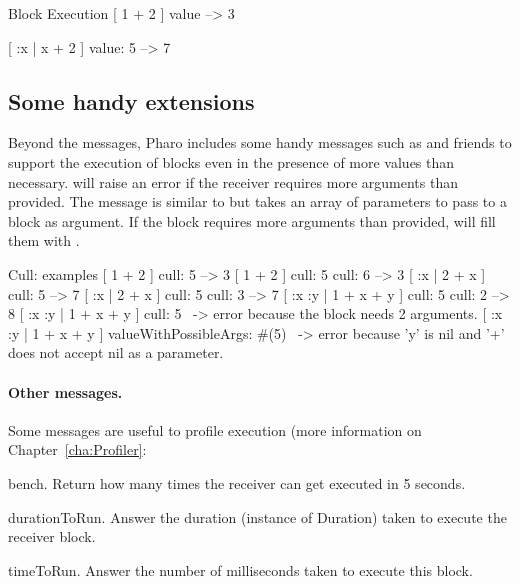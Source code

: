 \documentclass[a4paper,10pt,twoside]{book}
\begin{document}
\begin{code}{Block Execution}
[ 1 + 2 ] value --> 3

[ :x | x + 2 ] value: 5 --> 7
\end{code}

\subsection{Some handy extensions}

Beyond the  messages, Pharo includes some handy messages
such as  and friends to support the execution of blocks even
in the presence of more values than necessary.  will raise
an error if the receiver requires more arguments than provided. The
 message is similar to  but takes
an array of parameters to pass to a block as argument. If the block
requires more arguments than provided, 
will fill them with .

\begin{code}{Cull: examples}
[ 1 + 2 ] cull: 5 --> 3
[ 1 + 2 ] cull: 5 cull: 6 --> 3
[ :x | 2 + x ] cull: 5 --> 7
[ :x | 2 + x ] cull: 5 cull: 3 --> 7
[ :x :y | 1 + x + y ] cull: 5 cull: 2 --> 8
[ :x :y | 1 + x + y ] cull: 5 ~-> error because the block needs 2 arguments.
[ :x :y | 1 + x + y ] valueWithPossibleArgs: #(5)
                      ~-> error because 'y' is nil and '+' does not accept nil as a parameter.
\end{code}


\paragraph{Other messages.}

Some messages are useful to profile execution (more information on Chapter~\ref{cha:Profiler}:

\begin{description}
\item{\textsf{bench}}. Return how many times the receiver can get executed in 5 seconds.

\item{\textsf{durationToRun}}. Answer the duration (instance of Duration) taken to execute the receiver block.

\item{\textsf{timeToRun}}. Answer the number of milliseconds taken to execute this block.
\end{description}
\end{document}

